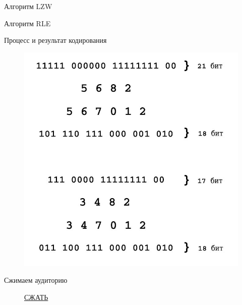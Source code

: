 \documentclass[11pt]{beamer}
\begin{document}
\begin{frame}{Алгоритм LZW}
\begin{frame}{Алгоритм RLE}
\begin{block}{Процесс и результат кодирования}
\begin{figure}[H]
	\begin{center}
		\includegraphics[scale=0.25]{../pics/RLE/example.jpg}
	\end{center}
\end{figure}	
\end{block}				
\end{frame} 



\begin{frame}{Сжимаем аудиторию}
\begin{figure}[H]
	\begin{center}
		\huge\href{http://octo.ejiek.com/job/image_compression_algorithms/}{СЖАТЬ}
	\end{center}
\end{figure}					
\end{frame} 




\end{frame}
\end{document}
